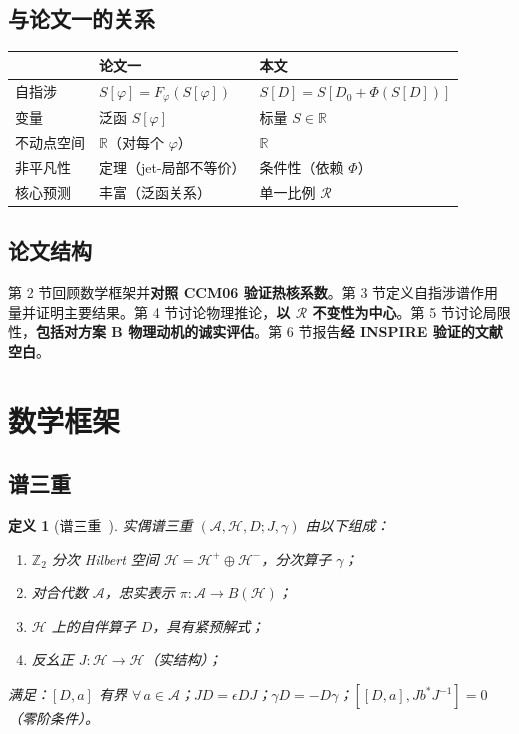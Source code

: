 \documentclass[11pt,a4paper]{ctexart}
\newtheorem{definition}[theorem]{定义}
\theoremstyle{remark}
\newcommand{\R}{\mathcal{R}}
\begin{document}
\subsection{与论文一的关系}

\begin{table}[h]
\centering
\begin{tabular}{lll}
\toprule
 & 论文一 & 本文 \\
\midrule
自指涉 & $S[\varphi] = F_\varphi(S[\varphi])$ & $S[D] = S[D_0 + \Phi(S[D])]$ \\
变量 & 泛函 $S[\varphi]$ & 标量 $S \in \mathbb{R}$ \\
不动点空间 & $\mathbb{R}$（对每个 $\varphi$） & $\mathbb{R}$ \\
非平凡性 & 定理（jet-局部不等价） & 条件性（依赖 $\Phi$） \\
核心预测 & 丰富（泛函关系） & 单一比例 $\R$ \\
\bottomrule
\end{tabular}
\end{table}

\subsection{论文结构}

第 2 节回顾数学框架并\textbf{对照 CCM06 验证热核系数}。第 3 节定义自指涉谱作用量并证明主要结果。第 4 节讨论物理推论，\textbf{以 $\R$ 不变性为中心}。第 5 节讨论局限性，\textbf{包括对方案 B 物理动机的诚实评估}。第 6 节报告\textbf{经 INSPIRE 验证的文献空白}。

\section{数学框架}

\subsection{谱三重}

\begin{definition}[谱三重~\cite{Con94}]
实偶谱三重 $(\mathcal{A}, \mathcal{H}, D; J, \gamma)$ 由以下组成：
\begin{enumerate}
  \item $\mathbb{Z}_2$ 分次 Hilbert 空间 $\mathcal{H} = \mathcal{H}^+ \oplus \mathcal{H}^-$，分次算子 $\gamma$；
  \item 对合代数 $\mathcal{A}$，忠实表示 $\pi: \mathcal{A} \to B(\mathcal{H})$；
  \item $\mathcal{H}$ 上的自伴算子 $D$，具有紧预解式；
  \item 反幺正 $J: \mathcal{H} \to \mathcal{H}$（实结构）；
\end{enumerate}
满足：$[D, a]$ 有界 $\forall\, a \in \mathcal{A}$；$JD = \epsilon DJ$；$\gamma D = -D\gamma$；$[[D, a], Jb^* J^{-1}] = 0$（零阶条件）。
\end{definition}
\end{document}
